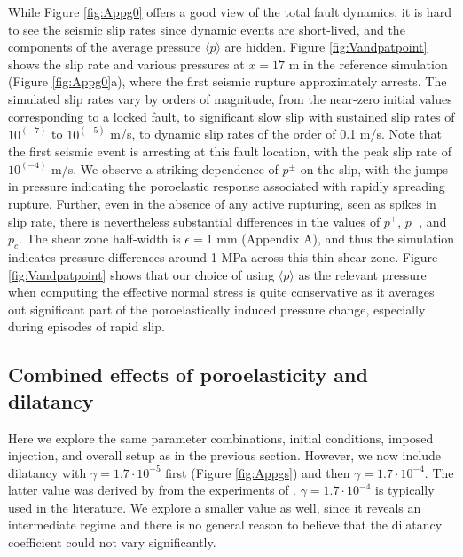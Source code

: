 \documentclass[draft]{agujournal2019}
\begin{document}
While Figure \ref{fig:Appg0} offers a good view of the total fault dynamics, it is hard to see the seismic slip rates since dynamic events are short-lived, and the components of the average pressure $\langle p \rangle$ are hidden. Figure \ref{fig:Vandpatpoint} shows the slip rate and various pressures at $x = 17$ m in the reference simulation (Figure \ref{fig:Appg0}a), where the first seismic rupture approximately arrests. The simulated slip rates vary by orders of magnitude, from the near-zero initial values corresponding to a locked fault, to significant slow slip with sustained slip rates of $10^(-7)$ to $10^(-5)$ m/s, to dynamic slip rates of the order of 0.1 m/s. Note that the first seismic event is arresting at this fault location, with the peak slip rate of $10^(-4)$ m/s. We observe a striking dependence of $p^\pm$ on the slip, with the jumps in pressure indicating the poroelastic response associated with rapidly spreading rupture. Further, even in the absence of any active rupturing, seen as spikes in slip rate, there is nevertheless substantial differences in the values of $p^+$, $p^-$, and  $p_c$. The shear zone half-width is $\epsilon =  1$ mm (Appendix A), and thus the simulation indicates pressure differences around 1 MPa across this thin shear zone. Figure \ref{fig:Vandpatpoint} shows that our choice of using $\langle p \rangle$ as the relevant pressure when computing the effective normal stress is quite conservative as it averages out significant part of the poroelastically induced pressure change, especially during episodes of rapid slip. 

\subsection{Combined effects of poroelasticity and dilatancy}

Here we explore the same parameter combinations, initial conditions, imposed injection, and overall setup as in the previous section. However, we now include dilatancy with $\gamma = 1.7 \cdot 10^{-5}$ first (Figure \ref{fig:Appgs}) and then $\gamma = 1.7 \cdot 10^{-4}$. The latter value was derived by  from the experiments of . $\gamma = 1.7 \cdot 10^{-4}$ is typically used in the literature. We explore a smaller value as well, since it reveals an intermediate regime and there is no general reason to believe that the dilatancy coefficient could not vary significantly.
\end{document}
